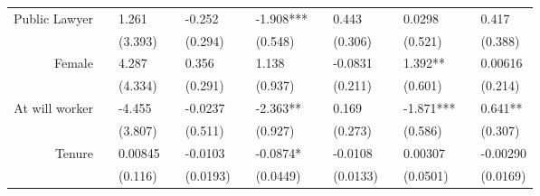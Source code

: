 \begin{tabular}{rrrrrrrrrrrrr}
Public Lawyer & \multicolumn{1}{l}{} & \multicolumn{1}{l}{1.261} & \multicolumn{1}{l}{} & \multicolumn{1}{l}{-0.252} & \multicolumn{1}{l}{} & \multicolumn{1}{l}{-1.908***} & \multicolumn{1}{l}{} & \multicolumn{1}{l}{0.443} & \multicolumn{1}{l}{} & \multicolumn{1}{l}{0.0298} & \multicolumn{1}{l}{} & \multicolumn{1}{l}{0.417} \\
      & \multicolumn{1}{l}{} & \multicolumn{1}{l}{(3.393)} & \multicolumn{1}{l}{} & \multicolumn{1}{l}{(0.294)} & \multicolumn{1}{l}{} & \multicolumn{1}{l}{(0.548)} & \multicolumn{1}{l}{} & \multicolumn{1}{l}{(0.306)} & \multicolumn{1}{l}{} & \multicolumn{1}{l}{(0.521)} & \multicolumn{1}{l}{} & \multicolumn{1}{l}{(0.388)} \\
Female & \multicolumn{1}{l}{} & \multicolumn{1}{l}{4.287} & \multicolumn{1}{l}{} & \multicolumn{1}{l}{0.356} & \multicolumn{1}{l}{} & \multicolumn{1}{l}{1.138} & \multicolumn{1}{l}{} & \multicolumn{1}{l}{-0.0831} & \multicolumn{1}{l}{} & \multicolumn{1}{l}{1.392**} & \multicolumn{1}{l}{} & \multicolumn{1}{l}{0.00616} \\
      & \multicolumn{1}{l}{} & \multicolumn{1}{l}{(4.334)} & \multicolumn{1}{l}{} & \multicolumn{1}{l}{(0.291)} & \multicolumn{1}{l}{} & \multicolumn{1}{l}{(0.937)} & \multicolumn{1}{l}{} & \multicolumn{1}{l}{(0.211)} & \multicolumn{1}{l}{} & \multicolumn{1}{l}{(0.601)} & \multicolumn{1}{l}{} & \multicolumn{1}{l}{(0.214)} \\
At will worker & \multicolumn{1}{l}{} & \multicolumn{1}{l}{-4.455} & \multicolumn{1}{l}{} & \multicolumn{1}{l}{-0.0237} & \multicolumn{1}{l}{} & \multicolumn{1}{l}{-2.363**} & \multicolumn{1}{l}{} & \multicolumn{1}{l}{0.169} & \multicolumn{1}{l}{} & \multicolumn{1}{l}{-1.871***} & \multicolumn{1}{l}{} & \multicolumn{1}{l}{0.641**} \\
      & \multicolumn{1}{l}{} & \multicolumn{1}{l}{(3.807)} & \multicolumn{1}{l}{} & \multicolumn{1}{l}{(0.511)} & \multicolumn{1}{l}{} & \multicolumn{1}{l}{(0.927)} & \multicolumn{1}{l}{} & \multicolumn{1}{l}{(0.273)} & \multicolumn{1}{l}{} & \multicolumn{1}{l}{(0.586)} & \multicolumn{1}{l}{} & \multicolumn{1}{l}{(0.307)} \\
Tenure & \multicolumn{1}{l}{} & \multicolumn{1}{l}{0.00845} & \multicolumn{1}{l}{} & \multicolumn{1}{l}{-0.0103} & \multicolumn{1}{l}{} & \multicolumn{1}{l}{-0.0874*} & \multicolumn{1}{l}{} & \multicolumn{1}{l}{-0.0108} & \multicolumn{1}{l}{} & \multicolumn{1}{l}{0.00307} & \multicolumn{1}{l}{} & \multicolumn{1}{l}{-0.00290} \\
      & \multicolumn{1}{l}{} & \multicolumn{1}{l}{(0.116)} & \multicolumn{1}{l}{} & \multicolumn{1}{l}{(0.0193)} & \multicolumn{1}{l}{} & \multicolumn{1}{l}{(0.0449)} & \multicolumn{1}{l}{} & \multicolumn{1}{l}{(0.0133)} & \multicolumn{1}{l}{} & \multicolumn{1}{l}{(0.0501)} & \multicolumn{1}{l}{} & \multicolumn{1}{l}{(0.0169)} \\

\end{tabular}
